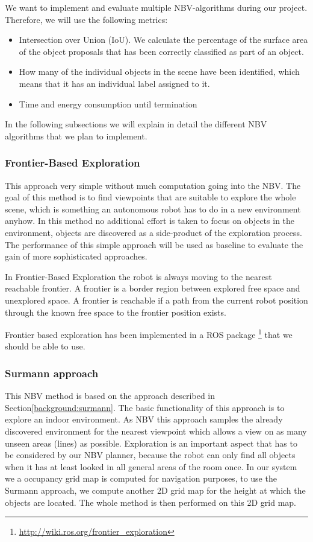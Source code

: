 \documentclass[a4paper,11pt,english]{article}
\begin{document}
We want to implement and evaluate multiple NBV-algorithms during our project.
Therefore, we will use the following metrics:
\begin{itemize}
	\item Intersection over Union (IoU). We calculate the percentage of the surface area of the object proposals that has been correctly classified as part of an object.
	\item How many of the individual objects in the scene have been identified, which means that it has an individual label assigned to it.
	\item Time and energy consumption until termination
\end{itemize}

In the following subsections we will explain in detail the different NBV algorithms that we plan to implement.

\subsubsection{Frontier-Based Exploration}
This approach very simple without much computation going into the NBV.
The goal of this method is to find viewpoints that are suitable to explore the whole scene, which is something an autonomous robot has to do in a new environment anyhow.
In this method no additional effort is taken to focus on objects in the environment, objects are discovered as a side-product of the exploration process.
The performance of this simple approach will be used as baseline to evaluate the gain of more sophisticated approaches.

In Frontier-Based Exploration the robot is always moving to the nearest reachable frontier.
A frontier is a border region between explored free space and unexplored space.
A frontier is reachable if a path from the current robot position through the known free space to the frontier position exists.

Frontier based exploration has been implemented in a ROS package \footnote{\url{http://wiki.ros.org/frontier_exploration}} that we should be able to use.

\subsubsection{Surmann approach}
This NBV method is based on the approach described in Section\ref{background:surmann}.
The basic functionality of this approach is to explore an indoor environment.
As NBV this approach samples the already discovered environment for the nearest viewpoint which allows a view on as many unseen areas (lines) as possible.
Exploration is an important aspect that has to be considered by our NBV planner, because the robot can only find all objects when it has at least looked in all general areas of the room once.
In our system we a occupancy grid map is computed for navigation purposes, to use the Surmann approach, we compute another 2D grid map for the height at which the objects are located.
The whole method is then performed on this 2D grid map.
\end{document}
